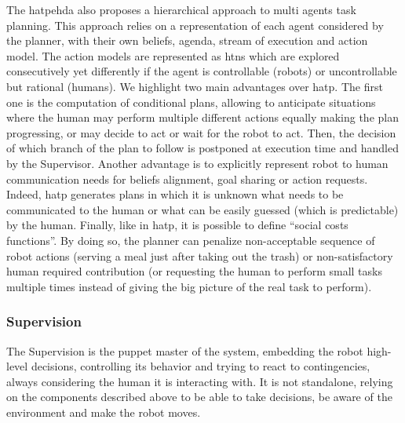 \documentclass[a4paper,11pt,twoside]{StyleThese}
\begin{document}
The \acrfull{hatpehda} also proposes a hierarchical approach to multi agents task planning. This approach relies on a representation of each agent considered by the planner, with their own beliefs, agenda, stream of execution and action model. The action models are represented as \acrshort{htn}s which are explored consecutively yet differently if the agent is controllable (robots) or uncontrollable but rational (humans). We highlight two main advantages over \acrshort{hatp}. The first one is the computation of conditional plans, allowing to anticipate situations where the human may perform multiple different actions equally making the plan progressing, or may decide to act or wait for the robot to act. Then, the decision of which branch of the plan to follow is postponed at execution time and handled by the Supervisor. Another advantage is to explicitly represent robot to human communication needs for beliefs alignment, goal sharing or action requests. Indeed, \acrshort{hatp} generates plans in which it is unknown what needs to be communicated to the human or what can be easily guessed (\ie which is predictable) by the human. Finally, like in \acrshort{hatp}, it is possible to define ``social costs functions''. By doing so, the planner can penalize non-acceptable sequence of robot actions (\eg serving a meal just after taking out the trash) or non-satisfactory human required contribution (\eg or requesting the human to perform small tasks multiple times instead of giving the big picture of the real task to perform).


\subsubsection{Supervision}
The Supervision is the puppet master of the system, embedding the robot high-level decisions, controlling its behavior and trying to react to contingencies, always considering the human it is interacting with. It is not standalone, relying on the components described above to be able to take decisions, be aware of the environment and make the robot moves.
\newline




\ifdefined{}
\else


\end{document}
